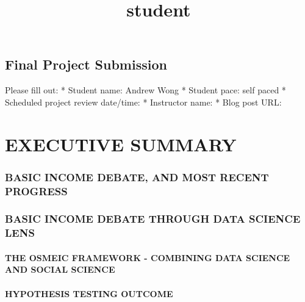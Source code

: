 \documentclass[11pt]{article}
\title{student}
\begin{document}
    
    
    \maketitle
    
    

    
    \hypertarget{final-project-submission}{%
\subsection{Final Project Submission}\label{final-project-submission}}

Please fill out: * Student name: Andrew Wong * Student pace: self paced
* Scheduled project review date/time: * Instructor name: * Blog post
URL:

    \hypertarget{executive-summary}{%
\section{EXECUTIVE SUMMARY}\label{executive-summary}}

    \hypertarget{basic-income-debate-and-most-recent-progress}{%
\subsubsection{BASIC INCOME DEBATE, AND MOST RECENT
PROGRESS}\label{basic-income-debate-and-most-recent-progress}}

\hypertarget{basic-income-debate-through-data-science-lens}{%
\subsubsection{BASIC INCOME DEBATE THROUGH DATA SCIENCE
LENS}\label{basic-income-debate-through-data-science-lens}}

\hypertarget{the-osmeic-framework---combining-data-science-and-social-science}{%
\paragraph{THE OSMEIC FRAMEWORK - COMBINING DATA SCIENCE AND SOCIAL
SCIENCE}\label{the-osmeic-framework---combining-data-science-and-social-science}}

\hypertarget{hypothesis-testing-outcome}{%
\paragraph{HYPOTHESIS TESTING
OUTCOME}\label{hypothesis-testing-outcome}}
\end{document}
